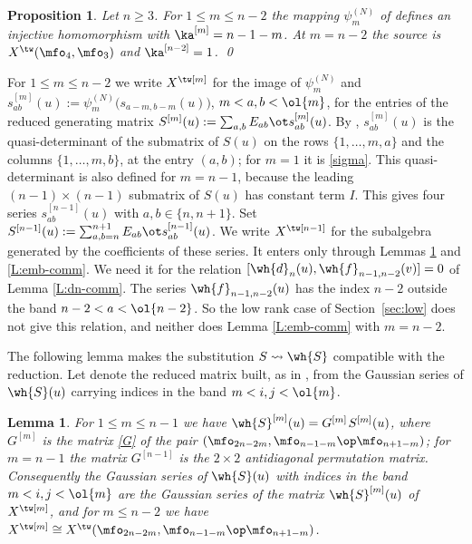 \documentclass{amsart}
\newtheorem{lemma}[theorem]{Lemma}
\newtheorem{prop}[theorem]{Proposition}
\numberwithin{equation}{section}
\theoremstyle{remark}
\renewcommand{\,}{\kern 0.1em} %
\begin{document}
\begin{prop} \label{P:emb1}
%
Let $n\ge3$. For $1\le m\le n-2$ the mapping $\psi^{(N)}_m$ of \cite[(2.59)]{Re26}
defines an injective homomorphism
%
\equ{
\psi^{(N)}_m \;:\; X^\tw\big(\mfo_{2n-2m},\,\mfo_{n-1-m}\op\mfo_{n+1-m}\big) \longrightarrow
X^\tw\big(\mfo_{2n},\,\mfo_{n-1}\op\mfo_{n+1}\big) ,
\label{psi_m}
}
%
with $\ka^{[m]} = n-1-m$. At $m=n-2$ the source is $X^\tw(\mfo_4,\mfo_3)$ and
$\ka^{[n-2]}=1$. \qed
%
\end{prop}

For $1\le m\le n-2$ we write $X^{\tw[m]}$ for the image of $\psi^{(N)}_m$ and
$s^{[m]}_{ab}(u) := \psi^{(N)}_m\big(s_{a-m,b-m}(u)\big)$, $m<a,b<\ol{m}$, for the entries of the
reduced generating matrix $S^{[m]}(u) := \sum_{a,b} E_{ab}\ot s^{[m]}_{ab}(u)$.
By \cite[(2.59)]{Re26}, $s^{[m]}_{ab}(u)$ is the
quasi-determinant of the submatrix of $S(u)$ on the rows $\{1,\ldots,m,a\}$ and the columns
$\{1,\ldots,m,b\}$, at the entry $(a,b)$; for $m=1$ it is \eqref{sigma}.
This quasi-determinant is also defined for $m=n-1$,
because the leading $(n-1)\times(n-1)$ submatrix of $S(u)$ has constant term $I$. This gives four
series $s^{[n-1]}_{ab}(u)$ with $a,b\in\{n,n+1\}$. Set
$S^{[n-1]}(u):=\sum_{a,b=n}^{n+1}E_{ab}\ot s^{[n-1]}_{ab}(u)$. We write $X^{\tw[n-1]}$ for the
subalgebra generated by the coefficients of these series. It enters only through
Lemmas \ref{L:Shat-red} and \ref{L:emb-comm}. We need it for the relation
$[\wh{d}_n(u),\wh{f}_{n-1,n-2}(v)]=0$ of Lemma \ref{L:dn-comm}. The series
$\wh{f}_{n-1,n-2}(u)$ has the index $n-2$ outside the band $n-2<a<\ol{n-2}$. So the low rank case
of Section~\ref{sec:low} does not give this relation, and neither does Lemma \ref{L:emb-comm} with
$m=n-2$.

The following lemma makes the substitution $S\rightsquigarrow\wh{S}$ compatible with the
reduction. Let
%
%
denote the reduced matrix built, as in \cite[(3.7)--(3.9)]{Re26}, from the Gaussian series of
$\wh{S}(u)$ carrying indices in the band $m<i,j<\ol{m}$.

\begin{lemma} \label{L:Shat-red}
%
For $1\le m\le n-1$ we have $\wh{S}^{[m]}(u) = G^{[m]}\,S^{[m]}(u)$, where $G^{[m]}$ is the
matrix \eqref{G} of the pair $(\mfo_{2n-2m},\mfo_{n-1-m}\op\mfo_{n+1-m})$; for $m=n-1$ the
matrix $G^{[n-1]}$ is the $2\times2$ antidiagonal permutation matrix. Consequently the
Gaussian series of $\wh{S}(u)$ with indices in the band $m<i,j<\ol{m}$ are the Gaussian series of
the matrix $\wh{S}^{[m]}(u)$ of $X^{\tw[m]}$, and for $m\le n-2$ we have
$X^{\tw[m]} \cong X^\tw(\mfo_{2n-2m},\mfo_{n-1-m}\op\mfo_{n+1-m})$.
%
\end{lemma}
\end{document}
